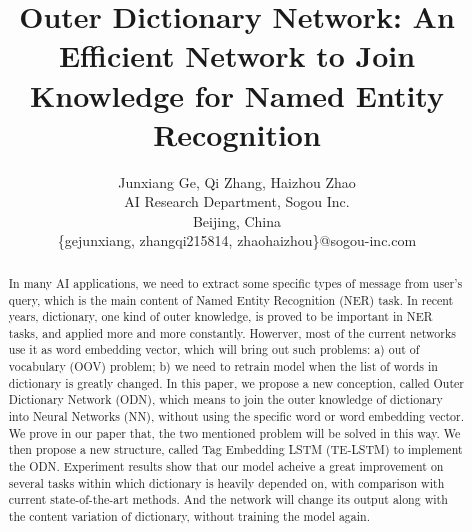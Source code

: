 \documentclass[letterpaper]{article} %
\title{ Outer Dictionary Network: An Efficient Network to Join Knowledge for Named Entity Recognition }
\author{Junxiang Ge, Qi Zhang, Haizhou Zhao\\ 
AI Research Department, Sogou Inc. \\
Beijing, China \\
\{gejunxiang, zhangqi215814, zhaohaizhou\}@sogou-inc.com}
\begin{document}
\maketitle

\begin{abstract}
In many AI applications, we need to extract some specific types of message from user's query, which is the main content of Named Entity Recognition (NER) task. In recent years, dictionary, one kind of outer knowledge, is proved to be important in NER tasks, and applied more and more constantly. Howerver, most of the current networks use it as word embedding vector, which will bring out such problems: a) out of vocabulary (OOV) problem; b) we need to retrain model when the list of words in dictionary is greatly changed. In this paper, we propose a new conception, called Outer Dictionary Network (ODN), which means to join the outer knowledge of dictionary into Neural Networks (NN), without using the specific word or word embedding vector. We prove in our paper that, the two mentioned problem will be solved in this way. We then propose a new structure, called Tag Embedding LSTM (TE-LSTM) to implement the ODN. Experiment results show that our model acheive a great improvement on several tasks within which dictionary is heavily depended on, with comparison with current state-of-the-art methods. And the network will change its output along with the content variation of dictionary, without training the model again.
\end{abstract}
\end{document}
